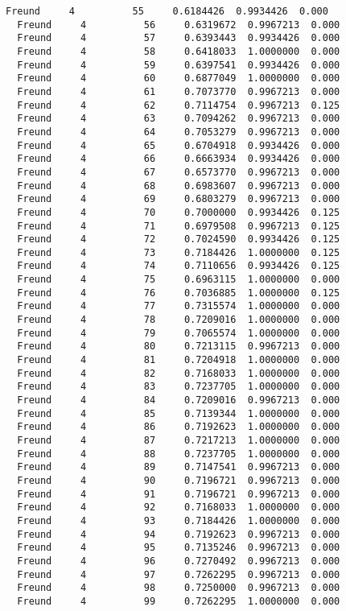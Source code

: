 \documentclass[11pt]{article}
\begin{document}
\begin{Verbatim}[commandchars=\\\{\}]
  Freund     4          55     0.6184426  0.9934426  0.000
  Freund     4          56     0.6319672  0.9967213  0.000
  Freund     4          57     0.6393443  0.9934426  0.000
  Freund     4          58     0.6418033  1.0000000  0.000
  Freund     4          59     0.6397541  0.9934426  0.000
  Freund     4          60     0.6877049  1.0000000  0.000
  Freund     4          61     0.7073770  0.9967213  0.000
  Freund     4          62     0.7114754  0.9967213  0.125
  Freund     4          63     0.7094262  0.9967213  0.000
  Freund     4          64     0.7053279  0.9967213  0.000
  Freund     4          65     0.6704918  0.9934426  0.000
  Freund     4          66     0.6663934  0.9934426  0.000
  Freund     4          67     0.6573770  0.9967213  0.000
  Freund     4          68     0.6983607  0.9967213  0.000
  Freund     4          69     0.6803279  0.9967213  0.000
  Freund     4          70     0.7000000  0.9934426  0.125
  Freund     4          71     0.6979508  0.9967213  0.125
  Freund     4          72     0.7024590  0.9934426  0.125
  Freund     4          73     0.7184426  1.0000000  0.125
  Freund     4          74     0.7110656  0.9934426  0.125
  Freund     4          75     0.6963115  1.0000000  0.000
  Freund     4          76     0.7036885  1.0000000  0.125
  Freund     4          77     0.7315574  1.0000000  0.000
  Freund     4          78     0.7209016  1.0000000  0.000
  Freund     4          79     0.7065574  1.0000000  0.000
  Freund     4          80     0.7213115  0.9967213  0.000
  Freund     4          81     0.7204918  1.0000000  0.000
  Freund     4          82     0.7168033  1.0000000  0.000
  Freund     4          83     0.7237705  1.0000000  0.000
  Freund     4          84     0.7209016  0.9967213  0.000
  Freund     4          85     0.7139344  1.0000000  0.000
  Freund     4          86     0.7192623  1.0000000  0.000
  Freund     4          87     0.7217213  1.0000000  0.000
  Freund     4          88     0.7237705  1.0000000  0.000
  Freund     4          89     0.7147541  0.9967213  0.000
  Freund     4          90     0.7196721  0.9967213  0.000
  Freund     4          91     0.7196721  0.9967213  0.000
  Freund     4          92     0.7168033  1.0000000  0.000
  Freund     4          93     0.7184426  1.0000000  0.000
  Freund     4          94     0.7192623  0.9967213  0.000
  Freund     4          95     0.7135246  0.9967213  0.000
  Freund     4          96     0.7270492  0.9967213  0.000
  Freund     4          97     0.7262295  0.9967213  0.000
  Freund     4          98     0.7250000  0.9967213  0.000
  Freund     4          99     0.7262295  1.0000000  0.000

\end{Verbatim}
\end{document}
